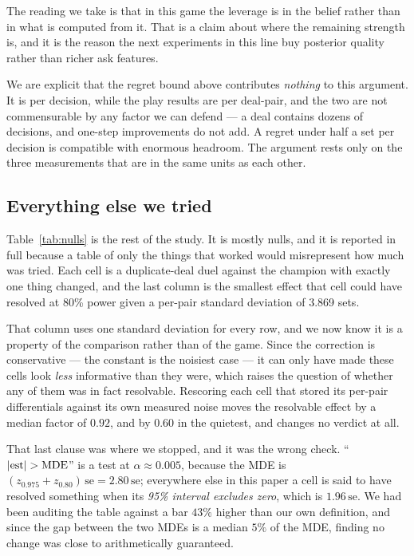 \documentclass[11pt,a4paper]{article}
\begin{document}
The reading we take is that in this game the leverage is in the belief rather
than in what is computed from it. That is a claim about where the remaining
strength is, and it is the reason the next experiments in this line buy
posterior quality rather than richer ask features.

We are explicit that the regret bound above contributes \emph{nothing} to this
argument. It is per decision, while the play results are per deal-pair, and the
two are not commensurable by any factor we can defend --- a deal contains dozens
of decisions, and one-step improvements do not add. A regret under half a set per
decision is compatible with enormous headroom. The argument rests only on the
three measurements that are in the same units as each other.

\subsection{Everything else we tried}
\label{sec:res-null}

Table~\ref{tab:nulls} is the rest of the study. It is mostly nulls, and it is
reported in full because a table of only the things that worked would
misrepresent how much was tried. Each cell is a duplicate-deal duel against the
champion with exactly one thing changed, and the last column is the smallest
effect that cell could have resolved at 80\% power given a per-pair standard
deviation of 3.869 sets.

That column uses one standard deviation for every row, and we now know it is a
property of the comparison rather than of the game. Since the correction is
conservative --- the constant is the noisiest case --- it can only have made
these cells look \emph{less} informative than they were, which raises the
question of whether any of them was in fact resolvable. Rescoring each cell that
stored its per-pair differentials against its own measured noise moves the
resolvable effect by a median factor of $0.92$, and by $0.60$ in the quietest,
and changes no verdict at all.

That last clause was where we stopped, and it was the wrong check. ``$|{\rm
est}| > {\rm MDE}$'' is a test at $\alpha \approx 0.005$, because the MDE is
$(z_{0.975} + z_{0.80})\,\mathrm{se} = 2.80\,\mathrm{se}$; everywhere else in
this paper a cell is said to have resolved something when its \emph{95\%
interval excludes zero}, which is $1.96\,\mathrm{se}$. We had been auditing the
table against a bar $43\%$ higher than our own definition, and since the gap
between the two MDEs is a median $5\%$ of the MDE, finding no change was close
to arithmetically guaranteed.
\end{document}
